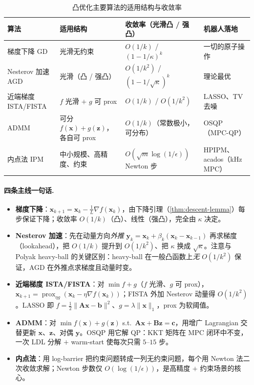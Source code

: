 \begin{table}[H]\centering\small
\caption{凸优化主要算法的适用结构与收敛率}
\label{tab:cvx-algo}
\begin{tabular}{llll}
\toprule
算法 & 适用结构 & 收敛率（光滑凸 / 强凸） & 机器人落地 \\
\midrule
梯度下降 GD & 光滑无约束 & $O(1/k)$ / $(1-1/\kappa)^k$ & 一切的原子操作 \\
Nesterov 加速 AGD & 光滑（凸 / 强凸） & $O(1/k^2)$ / $(1-1/\sqrt\kappa)^k$ & 理论最优 \\
近端梯度 ISTA/FISTA & $f$ 光滑 $+$ $g$ 可 prox & $O(1/k)$ / $O(1/k^2)$ & LASSO、TV 去噪 \\
ADMM & 可分 $f(\mathbf x)+g(\mathbf z)$，各自可 prox & $O(1/k)$（常数极小，可分布） & OSQP（MPC-QP） \\
内点法 IPM & 中小规模、高精度、约束 & $O(\sqrt m\log(1/\epsilon))$ Newton 步 & HPIPM、acados（kHz MPC） \\
\bottomrule
\end{tabular}
\end{table}

\paragraph{四条主线一句话.}
\begin{itemize}
  \item \textbf{梯度下降}：$\mathbf x_{k+1}=\mathbf x_k-\tfrac1L\nabla f(\mathbf x_k)$，由下降引理（\cref{thm:descent-lemma}）每步保证下降；收敛率 $O(1/k)$（凸）、线性（强凸），完全由 $\kappa$ 决定。
  \item \textbf{Nesterov 加速}：先在动量方向\emph{外推} $\mathbf y_k=\mathbf x_k+\beta_k(\mathbf x_k-\mathbf x_{k-1})$ 再求梯度（lookahead），把 $O(1/k)$ 提升到 $O(1/k^2)$、把 $\kappa$ 换成 $\sqrt\kappa$。注意与 Polyak heavy-ball 的关键区别：heavy-ball 在一般凸函数上\emph{无} $O(1/k^2)$ 保证，AGD 在外推点求梯度且动量时变。
  \item \textbf{近端梯度 ISTA/FISTA}：对 $\min f+g$（$f$ 光滑、$g$ 可 prox），$\mathbf x_{k+1}=\operatorname{prox}_{\eta g}(\mathbf x_k-\eta\nabla f(\mathbf x_k))$；FISTA 外加 Nesterov 动量得 $O(1/k^2)$。LASSO 即 $f=\tfrac12\|\mathbf A\mathbf x-\mathbf b\|^2$、$g=\lambda\|\mathbf x\|_1$，prox 为软阈值。
  \item \textbf{ADMM}：对 $\min f(\mathbf x)+g(\mathbf z)$ s.t.\ $\mathbf A\mathbf x+\mathbf B\mathbf z=\mathbf c$，用增广 Lagrangian 交替更新 $\mathbf x$、$\mathbf z$、对偶 $\mathbf y$。OSQP 用它解 QP：KKT 矩阵在 MPC 闭环中不变，一次 LDL 分解 $+$ warm-start 使每次只需 $5$--$15$ 步。
  \item \textbf{内点法}：用 log-barrier 把约束问题转成一列无约束问题，每个用 Newton 法二次收敛求解；Newton 步数仅 $O(\log(1/\epsilon))$，是高精度 $+$ 约束场景的核心。
\end{itemize}

